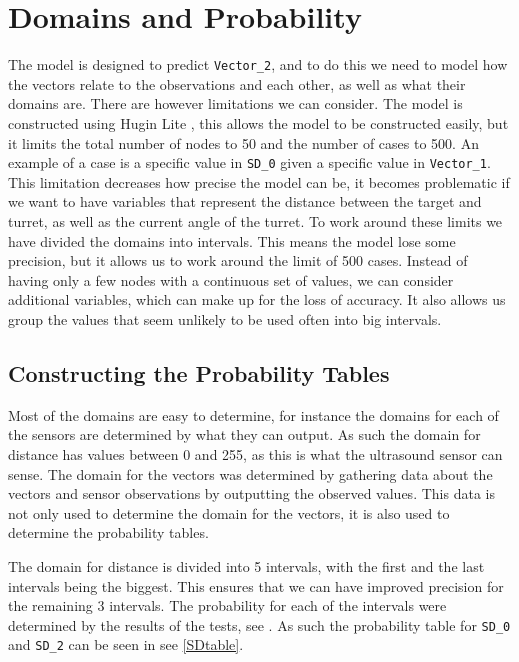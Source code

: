 \section{Domains and Probability}\label{MID}

The model is designed to predict \texttt{Vector\_2}, and to do this we need to
model how the vectors relate to the observations and each other, as well as
what their domains are. There are however limitations we can consider. The
model is constructed using Hugin Lite \citep{Hugin}, this allows the model to
be constructed easily, but it limits the total number of nodes to 50 and the
number of cases to 500. An example of a case is a specific value in \texttt{SD\_0}
given a specific value in \texttt{Vector\_1}. This limitation decreases how
precise the model can be, it becomes problematic if we want to have
variables that represent the distance between the target and turret, as well as
the current angle of the turret. To work around these limits we have divided
the domains into intervals. This means the model lose some precision, but it
allows us to work around the limit of 500 cases. Instead of having only a few
nodes with a continuous set of values, we can consider additional variables,
which can  make up for the loss of accuracy. It also allows us group the values
that seem unlikely to be used often into big intervals.

\subsection{Constructing the Probability Tables}

Most of the domains are easy to determine, for instance the domains for each of
the sensors are determined by what they can output. As such the domain for
distance has values between 0 and 255, as this is what the ultrasound sensor
can sense. The domain for the vectors was determined by gathering data about the
vectors and sensor observations by outputting the observed values. This data is
not only used to determine the domain for the vectors, it is also used to
determine the probability tables.\nl


The domain for distance is divided into 5 intervals, with the first and the last
intervals being the biggest. This ensures that we can have improved precision
for the remaining 3 intervals. The probability for each of the intervals were
determined by the results of the tests, see . As such
the probability table for \texttt{SD\_0} and \texttt{SD\_2} can be seen in see
\autoref{SDtable}.

